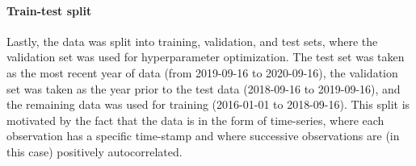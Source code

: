

\paragraph{Train-test split} Lastly, the data was split into training, validation, and test sets, where the validation set was used for hyperparameter optimization. The test set was taken as the most recent year of data (from 2019-09-16 to 2020-09-16), the validation set was taken as the year prior to the test data (2018-09-16 to 2019-09-16), and the remaining data was used for training (2016-01-01 to 2018-09-16). This split is motivated by the fact that the data is in the form of time-series, where each observation has a specific time-stamp and where successive observations are (in this case) positively autocorrelated.




